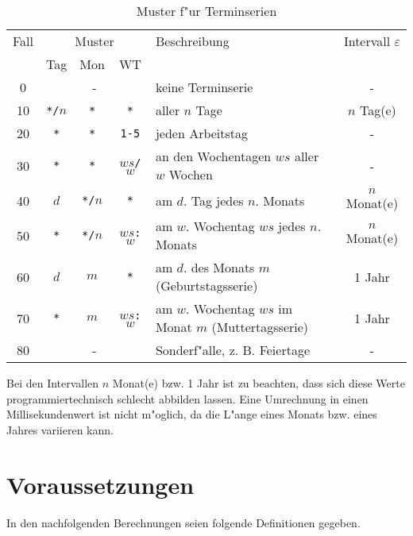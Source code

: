 \documentclass[a4paper]{article}
\numberwithin{equation}{section}
\begin{document}
\setcounter{footnote}{1}
\begin{table}[ht]
  \caption{Muster f"ur Terminserien}
  \label{tab:pattern}
  \begin{tabularx}{\textwidth}{ccccXc}
    \hline
    Fall & \multicolumn{3}{c}{Muster} & Beschreibung & Intervall $\varepsilon$ \\
    & Tag & Mon & WT & & \\
    \hline
    0 & \multicolumn{3}{c}{-} & keine Terminserie & - \\
    10 & \texttt{*/$n$} & \texttt{*} & \texttt{*} & aller $n$ Tage &
      $n$ Tag(e) \\
    20 & \texttt{*} & \texttt{*} & \texttt{1-5} & jeden Arbeitstag &
      - \\
    30 & \texttt{*} & \texttt{*} & \texttt{$ws$/$w$} &
      an den Wochentagen $ws$ aller $w$ Wochen & - \\
    40 & \texttt{$d$} & \texttt{*/$n$} & \texttt{*} &
      am $d$. Tag jedes $n$. Monats & $n$ Monat(e) \\
    50 & \texttt{*} & \texttt{*/$n$} & \texttt{$ws$:$w$} &
      am $w$. Wochentag $ws$ jedes $n$. Monats &
      $n$ Monat(e)\footnotemark[\ref{ft:oneMonth}] \\
    60 & \texttt{$d$} & \texttt{$m$} & \texttt{*} &
      am $d$. des Monats $m$ (Geburtstagsserie) & 1 Jahr \\
    70 & \texttt{*} & \texttt{$m$} & \texttt{$ws$:$w$} &
      am $w$. Wochentag $ws$ im Monat $m$ (Muttertagsserie) &
      1 Jahr\footnotemark[\ref{ft:oneMonth}] \\
    80 & \multicolumn{3}{c}{-} & Sonderf"alle, z. B. Feiertage & - \\
    \hline
  \end{tabularx}
\end{table}

\label{badInterval}
Bei den Intervallen $n$ Monat(e) bzw. 1 Jahr ist zu beachten, dass sich diese
Werte programmiertechnisch schlecht abbilden lassen. Eine Umrechnung in einen
Millisekundenwert ist nicht m"oglich, da die L"ange eines Monats bzw. eines
Jahres variieren kann.



%
%
%
%
\section{Voraussetzungen}
In den nachfolgenden Berechnungen seien folgende Definitionen gegeben.
\end{document}
